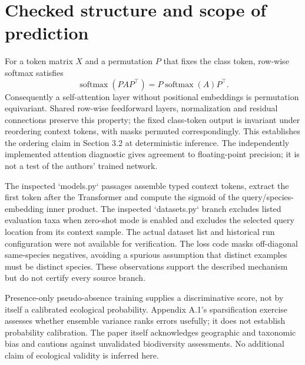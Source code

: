 \documentclass[10pt]{article}
\begin{document}
\section*{Checked structure and scope of prediction}
For a token matrix \(X\) and a permutation \(P\) that fixes the class token, row-wise softmax satisfies \[\operatorname{softmax}(PAP^\top)=P\operatorname{softmax}(A)P^\top.\] Consequently a self-attention layer without positional embeddings is permutation equivariant. Shared row-wise feedforward layers, normalization and residual connections preserve this property; the fixed class-token output is invariant under reordering context tokens, with masks permuted correspondingly. This establishes the ordering claim in Section 3.2 at deterministic inference. The independently implemented attention diagnostic gives agreement to floating-point precision; it is not a test of the authors’ trained network.\par
The inspected `models.py` passages assemble typed context tokens, extract the first token after the Transformer and compute the sigmoid of the query/species-embedding inner product. The inspected `datasets.py` branch excludes listed evaluation taxa when zero-shot mode is enabled and excludes the selected query location from its context sample. The actual dataset list and historical run configuration were not available for verification. The loss code masks off-diagonal same-species negatives, avoiding a spurious assumption that distinct examples must be distinct species. These observations support the described mechanism but do not certify every source branch.\par
Presence-only pseudo-absence training supplies a discriminative score, not by itself a calibrated ecological probability. Appendix A.1’s sparsification exercise assesses whether ensemble variance ranks errors usefully; it does not establish probability calibration. The paper itself acknowledges geographic and taxonomic bias and cautions against unvalidated biodiversity assessments. No additional claim of ecological validity is inferred here.\par
\end{document}
